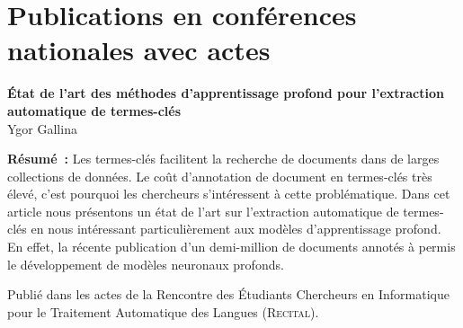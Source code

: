 \vspace{-0.6cm}

\section*{Publications en conférences nationales avec actes}

\vspace{-0.2cm}

\noindent
\textbf{État de l'art des méthodes d'apprentissage profond pour l'extraction automatique de termes-clés} \cite{gallina_etat_2019}\\
Ygor Gallina%

\noindent
\textbf{Résumé~:}
Les termes-clés facilitent la recherche de documents dans de larges collections de données. Le coût d'annotation de document en termes-clés très élevé, c'est pourquoi les chercheurs s'intéressent à cette problématique. Dans cet article nous présentons un état de l'art sur l'extraction automatique de termes-clés en nous intéressant particulièrement aux modèles d'apprentissage profond. En effet, la récente publication d'un demi-million de documents annotés à permis le développement de modèles neuronaux profonds.

\noindent
Publié dans les actes de la Rencontre des Étudiants Chercheurs en Informatique pour le Traitement Automatique des Langues (\textsc{Recital}).